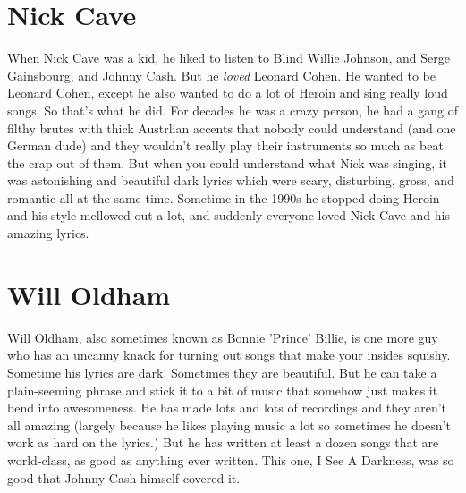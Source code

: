 \documentclass[letterpaper,12pt,single]{article}
\begin{document}
\section{Nick Cave}

When Nick Cave was a kid, he liked to listen to Blind Willie Johnson, and Serge Gainsbourg, and Johnny Cash. But he \emph{loved} Leonard Cohen. He wanted to be Leonard Cohen, except he also wanted to do a lot of Heroin and sing really loud songs. So that's what he did. For decades he was a crazy person, he had a gang of filthy brutes with thick Austrlian accents that nobody could understand (and one German dude) and they wouldn't really play their instruments so much as beat the crap out of them. But when you could understand what Nick was singing, it was astonishing and beautiful dark lyrics which were scary, disturbing, gross, and romantic all at the same time. Sometime in the 1990s he stopped doing Heroin and his style mellowed out a lot, and suddenly everyone loved Nick Cave and his amazing lyrics.

\section{Will Oldham}

Will Oldham, also sometimes known as Bonnie 'Prince' Billie, is one more guy who has an uncanny knack for turning out songs that make your insides squishy. Sometime his lyrics are dark. Sometimes they are beautiful. But he can take a plain-seeming phrase and stick it to a bit of music that somehow just makes it bend into awesomeness. He has made lots and lots of recordings and they aren't all amazing (largely because he likes playing music a lot so sometimes he doesn't work as hard on the lyrics.) But he has written at least a dozen songs that are world-class, as good as anything ever written. This one, I See A Darkness, was so good that Johnny Cash himself covered it.
\end{document}

